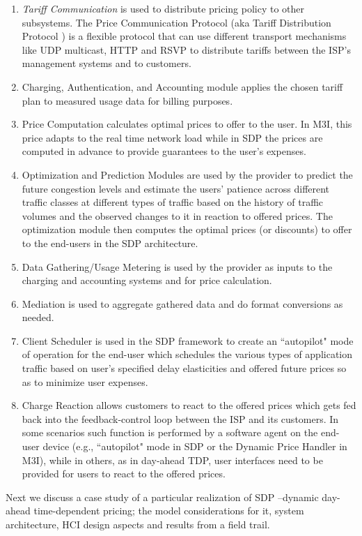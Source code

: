 \begin{enumerate}
\item \emph{Tariff Communication} is used to distribute pricing policy to other subsystems. The Price Communication Protocol (aka Tariff Distribution Protocol \cite{protocol}) is a flexible protocol that can use different transport mechanisms like UDP multicast, HTTP and RSVP to distribute tariffs between the ISP's management systems and to customers. 
\item Charging, Authentication, and Accounting module applies the chosen tariff plan to measured usage data for billing purposes.
\item Price Computation calculates optimal prices to offer to the user. In M3I, this price adapts to the real time network load while in SDP the prices are computed in advance to provide guarantees to the user's expenses. 
\item Optimization and Prediction Modules are used by the provider to predict the future congestion levels and estimate the users' patience across different traffic classes at different types of traffic based on the history of traffic volumes and the observed changes to it in reaction to offered prices. The optimization module then computes the optimal prices (or discounts) to offer to the end-users in the SDP architecture.
\item Data Gathering/Usage Metering is used by the provider as inputs to the charging and accounting systems and for price calculation.
\item Mediation is used to aggregate gathered data and do format conversions as needed.
\item Client Scheduler is used in the SDP framework to create an ``autopilot" mode of operation for the end-user which schedules the various types of application traffic based on user's specified delay elasticities and offered future prices so as to minimize user expenses.
\item Charge Reaction allows customers to react to the offered prices which gets fed back into the feedback-control loop between the ISP and its customers. In some scenarios such function is performed by a software agent on the end-user device (e.g., ``autopilot" mode in SDP or the Dynamic Price Handler in M3I), while in others, as in day-ahead TDP, user interfaces need to be provided for users to react to the offered prices.  
\end{enumerate}       

Next we discuss a case study of a particular realization of SDP --dynamic day-ahead time-dependent pricing; the model considerations for it, system architecture, HCI design aspects and results from a field trail.  